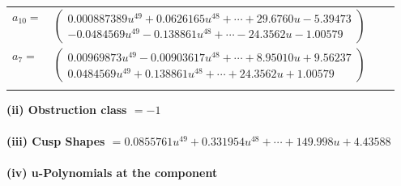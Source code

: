 \documentclass[1p]{elsarticle_modified}
\theoremstyle{definition}
\begin{document}
\begin{tabular}{m{7pt} m{180pt} m{7pt} m{180pt} }
\flushright $a_{10}=$&$\begin{pmatrix}0.000887389 u^{49}+0.0626165 u^{48}+\cdots+29.6760 u-5.39473\\-0.0484569 u^{49}-0.138861 u^{48}+\cdots-24.3562 u-1.00579\end{pmatrix}$ \\
\flushright $a_{7}=$&$\begin{pmatrix}0.00969873 u^{49}-0.00903617 u^{48}+\cdots+8.95010 u+9.56237\\0.0484569 u^{49}+0.138861 u^{48}+\cdots+24.3562 u+1.00579\end{pmatrix}$\\&\end{tabular}
\flushleft \textbf{(ii) Obstruction class $= -1$}\\~\\
\flushleft \textbf{(iii) Cusp Shapes $= 0.0855761 u^{49}+0.331954 u^{48}+\cdots+149.998 u+4.43588$}\\~\\
\newpage\renewcommand{\arraystretch}{1}
\flushleft \textbf{(iv) u-Polynomials at the component}\newline \\
\end{document}
